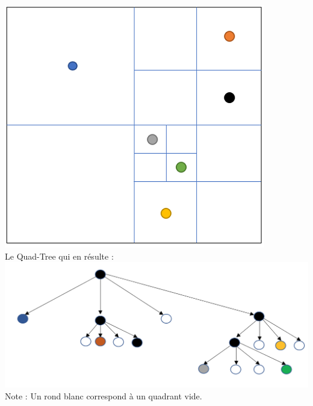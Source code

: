 \begin{Exercice}[10 minutes]
\begin{solution}
    \includegraphics[]{solutions/Quad-Tree 3 solution 1.PNG}\\
    
    Le Quad-Tree qui en résulte :\\
    
    \includegraphics[scale=0.65]{solutions/Quad-Tree 3 solution 2.1.png}\\
    
    Note : Un rond blanc correspond à un quadrant vide.
    
\end{solution}
\end{Exercice}


